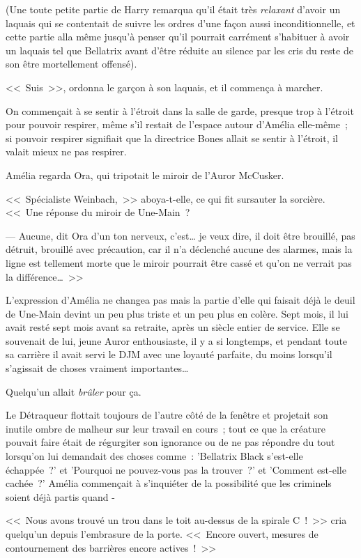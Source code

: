 (Une toute petite partie de Harry remarqua qu'il était très \emph{relaxant} d'avoir un laquais qui se contentait de suivre les ordres d'une façon aussi inconditionnelle, et cette partie alla même jusqu'à penser qu'il pourrait carrément s'habituer à avoir un laquais tel que Bellatrix avant d'être réduite au silence par les cris du reste de son être mortellement offensé).

<<~Suis~>>, ordonna le garçon à son laquais, et il commença à marcher.

\later

On commençait à se sentir à l'étroit dans la salle de garde, presque trop à l'étroit pour pouvoir respirer, même s'il restait de l'espace autour d'Amélia elle-même~; si pouvoir respirer signifiait que la directrice Bones allait se sentir à l'étroit, il valait mieux ne pas respirer.

Amélia regarda Ora, qui tripotait le miroir de l'Auror McCusker.

<<~Spécialiste Weinbach,~>> aboya-t-elle, ce qui fit sursauter la sorcière. <<~Une réponse du miroir de Une-Main~?

--- Aucune, dit Ora d'un ton nerveux, c'est… je veux dire, il doit être brouillé, pas détruit, brouillé avec précaution, car il n'a déclenché aucune des alarmes, mais la ligne est tellement morte que le miroir pourrait être cassé et qu'on ne verrait pas la différence…~>>

L'expression d'Amélia ne changea pas mais la partie d'elle qui faisait déjà le deuil de Une-Main devint un peu plus triste et un peu plus en colère. Sept mois, il lui avait resté sept mois avant sa retraite, après un siècle entier de service. Elle se souvenait de lui, jeune Auror enthousiaste, il y a si longtemps, et pendant toute sa carrière il avait servi le DJM avec une loyauté parfaite, du moins lorsqu'il s'agissait de choses vraiment importantes…

Quelqu'un allait \emph{brûler} pour ça.

Le Détraqueur flottait toujours de l'autre côté de la fenêtre et projetait son inutile ombre de malheur sur leur travail en cours~; tout ce que la créature pouvait faire était de régurgiter son ignorance ou de ne pas répondre du tout lorsqu'on lui demandait des choses comme~: 'Bellatrix Black s'est-elle échappée~?' et 'Pourquoi ne pouvez-vous pas la trouver~?' et 'Comment est-elle cachée~?' Amélia commençait à s'inquiéter de la possibilité que les criminels soient déjà partis quand -

<<~Nous avons trouvé un trou dans le toit au-dessus de la spirale C~!~>> cria quelqu'un depuis l'embrasure de la porte. <<~Encore ouvert, mesures de contournement des barrières encore actives~!~>>

